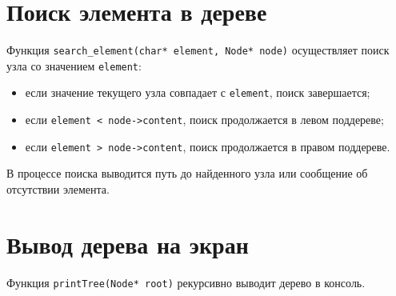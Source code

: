 \section{Поиск элемента в дереве}
Функция \texttt{search\_element(char* element, Node* node)} осуществляет поиск узла со значением \texttt{element}:
\begin{itemize}
	\item если значение текущего узла совпадает с \texttt{element}, поиск завершается;
	\item если \texttt{element < node->content}, поиск продолжается в левом поддереве;
	\item если \texttt{element > node->content}, поиск продолжается в правом поддереве.
\end{itemize}
В процессе поиска выводится путь до найденного узла или сообщение об отсутствии элемента.

\section{Вывод дерева на экран}
Функция \texttt{printTree(Node* root)} рекурсивно выводит дерево в консоль. 
\clearpage
